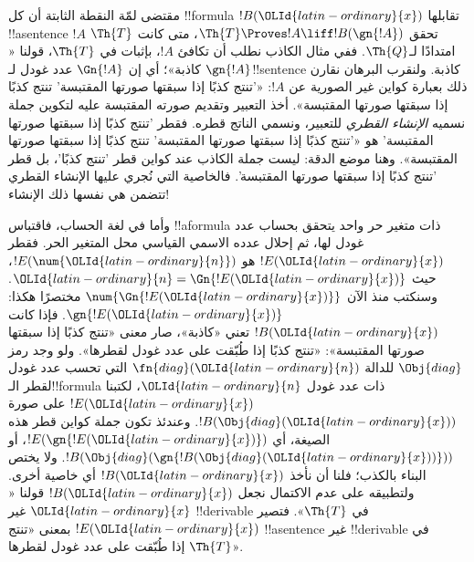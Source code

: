 \documentclass[../../../include/open-logic-section]{subfiles}
\begin{document}


\begin{explain}
مقتضى لمّة النقطة الثابتة أن كل !!{formula} $!B({\OLId{latin-ordinary}{x}})$ تقابلها
!!a{sentence} $!A$ تحقق $\Th{T}\Proves !A\liff !B(\gn{!A})$،
متى كانت $\Th{T}$ امتدادًا لـ$\Th{Q}$. ففي مثال الكاذب نطلب
أن تكافئ $!A$، بإثبات في $\Th{T}$، قولنا «$\gn{!A}$ كاذبة»؛
أي إن $\Gn{!A}$ عدد غودل لـ!!{sentence} كاذبة. ولنقرب البرهان
نقارن ذلك بعبارة كواين غير الصورية عن $!A$: «'تنتج كذبًا إذا
سبقتها صورتها المقتبسة' تنتج كذبًا إذا سبقتها صورتها المقتبسة».
أخذ التعبير وتقديم صورته المقتبسة عليه لتكوين جملة نسميه
\emph{الإنشاء القطري} للتعبير، ونسمي الناتج قطره.
فقطر 'تنتج كذبًا إذا سبقتها صورتها المقتبسة' هو «'تنتج كذبًا إذا
سبقتها صورتها المقتبسة' تنتج كذبًا إذا سبقتها صورتها المقتبسة».
وهنا موضع الدقة: ليست جملة الكاذب عند كواين قطر 'تنتج كذبًا'،
بل قطر 'تنتج كذبًا إذا سبقتها صورتها المقتبسة'. فالخاصية التي
نُجري عليها الإنشاء القطري تتضمن هي نفسها ذلك الإنشاء!{}

وأما في لغة الحساب، فاقتباس !!a{formula} ذات متغير حر واحد
يتحقق بحساب عدد غودل لها، ثم إحلال عدده الاسمي القياسي محل
المتغير الحر. فقطر $!E({\OLId{latin-ordinary}{x}})$ هو $!E(\num{{\OLId{latin-ordinary}{n}}})$، حيث
${\OLId{latin-ordinary}{n}}=\Gn{!E({\OLId{latin-ordinary}{x}})}$. وسنكتب منذ الآن $\num{\Gn{!E({\OLId{latin-ordinary}{x}})}}$
مختصرًا هكذا: $\gn{!E({\OLId{latin-ordinary}{x}})}$. فإذا كانت $!B({\OLId{latin-ordinary}{x}})$ تعني «كاذبة»،
صار معنى «تنتج كذبًا إذا سبقتها صورتها المقتبسة»: «تنتج كذبًا
إذا طُبّقت على عدد غودل لقطرها». ولو وجد رمز $\Obj{diag}$
للدالة $\fn{diag}({\OLId{latin-ordinary}{n}})$ التي تحسب عدد غودل لقطر الـ!!{formula}
ذات عدد غودل ${\OLId{latin-ordinary}{n}}$، لكتبنا $!E({\OLId{latin-ordinary}{x}})$ على صورة $!B(\Obj{diag}({\OLId{latin-ordinary}{x}}))$.
وعندئذ تكون جملة كواين قطر هذه الصيغة، أي $!E(\gn{!E({\OLId{latin-ordinary}{x}})})$،
أو $!B(\Obj{diag}(\gn{!B(\Obj{diag}({\OLId{latin-ordinary}{x}}))}))$. ولا يختص البناء
بالكذب؛ فلنا أن نأخذ $!B({\OLId{latin-ordinary}{x}})$ أي خاصية أخرى. ولتطبيقه على عدم
الاكتمال نجعل $!B({\OLId{latin-ordinary}{x}})$ قولنا «${\OLId{latin-ordinary}{x}}$ غير !!{derivable} في
$\Th{T}$». فتصير $!E({\OLId{latin-ordinary}{x}})$ بمعنى «تنتج !!a{sentence} غير
!!{derivable} في $\Th{T}$ إذا طُبّقت على عدد غودل لقطرها».


\end{explain}
\end{document}
